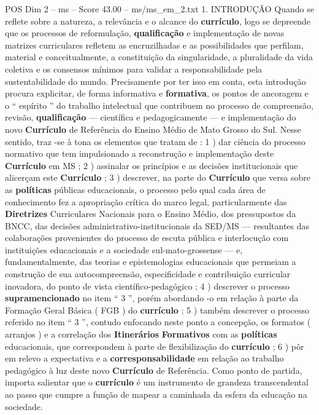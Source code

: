 \begin{textsample}{POS Dim 2 – ms – Score 43.00 – ms/ms\_em\_2.txt}  \label{ex:f2_pos_042}
1.
INTRODUÇÃO Quando se reflete sobre a natureza, a relevância e o alcance do \textbf{currículo}, logo se depreende que os processos de reformulação, \textbf{qualificação} e implementação de novas matrizes curriculares refletem as encruzilhadas e as possibilidades que perfilam, material e conceitualmente, a constituição da singularidade, a pluralidade da vida coletiva e os consensos mínimos para validar a responsabilidade pela sustentabilidade do mundo.
Precisamente por ter isso em conta, esta introdução procura explicitar, de forma informativa e \textbf{formativa}, os pontos de ancoragem e o “ espírito ” do trabalho intelectual que contribuem no processo de compreensão, revisão, \textbf{qualificação} — científica e pedagogicamente — e implementação do novo \textbf{Currículo} de Referência do Ensino Médio de Mato Grosso do Sul.
Nesse sentido, traz -se à tona os elementos que tratam de : 1 ) dar ciência do processo normativo que tem impulsionado a reconstrução e implementação deste \textbf{Currículo} em MS ; 2 ) assinalar os princípios e as decisões institucionais que alicerçam este \textbf{Currículo} ; 3 ) descrever, na parte do \textbf{Currículo} que versa sobre as \textbf{políticas} públicas educacionais, o processo pelo qual cada área de conhecimento fez a apropriação crítica do marco legal, particularmente das \textbf{Diretrizes} Curriculares Nacionais para o Ensino Médio, dos pressupostos da BNCC, das decisões administrativo-institucionais da SED/MS — resultantes das colaborações provenientes do processo de escuta pública e interlocução com instituições educacionais e a sociedade sul-mato-grossense — e, fundamentalmente, das teorias e epistemologias educacionais que permeiam a construção de sua autocompreensão, especificidade e contribuição curricular inovadora, do ponto de vista científico-pedagógico ; 4 ) descrever o processo \textbf{supramencionado} no item “ 3 ”, porém abordando -o em relação à parte da Formação Geral Básica ( FGB ) do \textbf{currículo} ; 5 ) também descrever o processo referido no item “ 3 ”, contudo enfocando neste ponto a concepção, os formatos ( arranjos ) e a correlação dos \textbf{Itinerários} \textbf{Formativos} com as \textbf{políticas} educacionais, que correspondem à parte de flexibilização do \textbf{currículo} ; 6 ) pôr em relevo a expectativa e a \textbf{corresponsabilidade} em relação ao trabalho pedagógico à luz deste novo \textbf{Currículo} de Referência.
Como ponto de partida, importa salientar que o \textbf{currículo} é um instrumento de grandeza transcendental ao passo que cumpre a função de mapear a caminhada da esfera da educação na sociedade.

\end{textsample}
